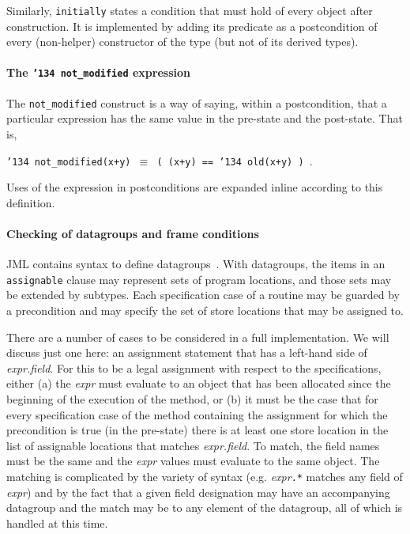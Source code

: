 \documentclass{llncs}
\begin{document}
Similarly, \texttt{initially} states a condition that must hold of
every object after construction.  It is implemented by adding its
predicate as a postcondition of every (non-helper) constructor of the
type (but not of its derived types).

\paragraph*{The \texttt{\char'134 not\_modified} expression}
The \texttt{not\_modified} construct is a way of saying, within a
postcondition, that a particular expression has the same value in the
pre-state and the post-state.  That is,
\begin{center}
\texttt{\char'134 not\_modified(x+y) $\equiv$ ( (x+y) == \char'134 old(x+y) )  }.
\end{center}
Uses of the expression in postconditions are expanded inline according
to this definition.

\paragraph*{Checking of datagroups and frame conditions}
JML contains syntax to define 
datagroups~\cite{Leino-Poetzsch-Heffter-Zhou02}.  With datagroups, the items in
an \texttt{assignable} clause may represent sets of program locations,
and those sets may be extended by subtypes.  Each
specification case of a routine may be guarded by a
precondition and may specify the set of store locations that may be
assigned to.

There are a number of cases to be considered in a full implementation.
We will discuss just one here: an assignment statement that has a
left-hand side of \textit{expr.field}.  For this to be a legal
assignment with respect to the specifications, either (a) the
\textit{expr} must evaluate to an object that has been allocated since
the beginning of the execution of the method, or (b) it must be the
case that for every specification case of the method containing the
assignment for which the precondition is true (in the pre-state) there
is at least one store location in the list of assignable locations
that matches \textit{expr.field}.  To match, the field names must be
the same and the \textit{expr} values must evaluate to the same
object.  The matching is complicated by the variety of syntax (e.g.
\textit{expr}\texttt{.*} matches any field of \textit{expr}) and by
the fact that a given field designation may have an accompanying
datagroup and the match may be to any element of the datagroup, all of
which is handled at this time.
\end{document}
